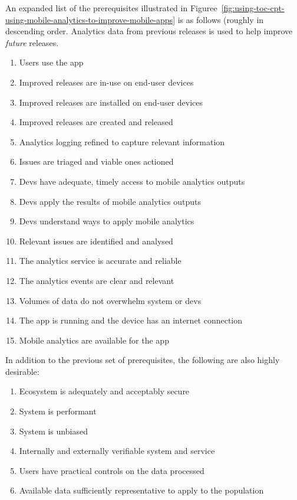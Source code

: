 An expanded list of the prerequisites illustrated in Figuree~\ref{fig:using-toc-cpt-using-mobile-analytics-to-improve-mobile-apps} is as follows (roughly in descending order. Analytics data from previous releases is used to help improve \emph{future} releases.
{\small
\begin{enumerate}
    \itemsep0em
    \item Users use the app
    \item Improved releases are in-use on end-user devices
    \item Improved releases are installed on end-user devices
    \item Improved releases are created and released
    \item Analytics logging refined to capture relevant information
    \item Issues are triaged and viable ones actioned
    \item Devs have adequate, timely access to mobile analytics outputs
    \item Devs apply the results of mobile analytics outputs
    \item Devs understand ways to apply mobile analytics
    \item Relevant issues are identified and analysed
    \item The analytics service is accurate and reliable
    \item The analytics events are clear and relevant
    \item Volumes of data do not overwhelm system or devs
    \item The app is running and the device has an internet connection
    \item Mobile analytics are available for the app
\end{enumerate}
}


In addition to the previous set of prerequisites, the following are also highly desirable:
{\small
\begin{enumerate} [i]
    \itemsep0em
    \item Ecosystem is adequately and acceptably secure
    \item System is performant
    \item System is unbiased
    \item Internally and externally verifiable system and service
    \item Users have practical controls on the data processed
    \item Available data sufficiently representative to apply to the population
\end{enumerate}
}

